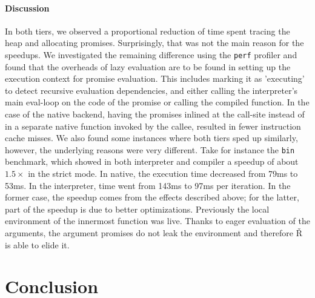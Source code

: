 \documentclass[review,creen,acmsmall]{acmart}
\renewcommand{\Rsh}{{\sf\v R}\xspace}
\begin{document}
\paragraph{Discussion}

In both tiers, we observed a proportional reduction of time spent tracing the
heap and allocating promises. Surprisingly, that was not the main reason
for the speedups. We investigated the remaining difference using the
\lstinline{perf} profiler and found that the overheads of lazy evaluation are to
be found in setting up the execution context for promise evaluation. This
includes marking it as 'executing' to detect recursive evaluation dependencies,
and either calling the interpreter's main eval-loop on the code of the promise or
calling the compiled function. In the case of the native backend, having the
promises inlined at the call-site instead of in a separate native function
invoked by the callee, resulted in fewer instruction cache misses. We also found
some instances where both tiers sped up similarly, however, the underlying
reasons were very different. Take for instance the \lstinline{bin} benchmark,
which showed in both interpreter and compiler a speedup of about $1.5\times$ in
the strict mode. In native, the execution time decreased from 79ms to 53ms. In
the interpreter, time went from 143ms to 97ms per iteration. In the former case,
the speedup comes from the effects described above; for the latter, part of the
speedup is due to better optimizations. Previously the local environment of
the innermost function was live. Thanks to eager evaluation of the arguments,
the argument promises do not leak the environment and therefore \Rsh is able to
elide it.

\section{Conclusion}\label{sec:conclusion}
\end{document}
